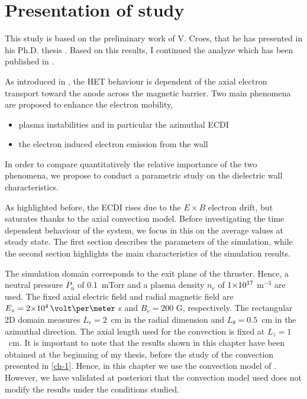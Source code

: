 
\section{Presentation of study}
  \label{sec-params}
  
  \begin{Chabstract}
    
  This study is based on the preliminary work of V. Croes, that he has presented in his Ph.D. thesis \citep{croes2017}.
  Based on this results, I continued the analyze which has been published in  \citet*{tavant2018}.
\end{Chabstract}
  
  \vspace{1ex}
  
  
  As introduced in , the \ac{HET} behaviour is dependent of the axial electron transport toward the anode across the magnetic barrier.
  Two main phenomena are proposed to enhance the electron mobility,
  \begin{itemize}
    \item plasma instabilities and in particular the azimuthal \ac{ECDI}
    \item the electron induced electron emission from the wall
  \end{itemize}
  In order to compare quantitatively the relative importance of the two phenomena, we propose to conduct a parametric study on the dielectric wall characteristics.

  As highlighted before, the \ac{ECDI} rises due to the $E \times B$ electron drift, but saturates thanks to the axial convection model.
  Before investigating the time dependent behaviour of the system, we focus in this  on the average values at steady state.
  The first section describes the parameters of the simulation, 
  while the second section highlights the main characteristics of the simulation results.

  
  The simulation domain corresponds to the exit plane of the thruster.
  Hence, a neutral pressure $P_n$ of 0.1~mTorr and a plasma density $n_e$ of ${{1}{\times}10^{17}}$ m$^{-3}$ are used.
  The fixed axial electric field and radial magnetic field are $E_z=\sn{2}{4}\,\volt\per\meter$ s and $B_r=200$ G, respectively.
  The rectangular \ac{2D} domain measures $L_r=2$~cm in the radial dimension and $L_{\theta}=0.5$~cm in the azimuthal direction.
  The axial length used for the convection is fixed at $L_z=1$~cm.
  It is important to note that the results shown in this chapter have been obtained at the beginning of my thesis, before the study of the convection presented in \cref{ch-1}.
  Hence, in this chapter we use the convection model of \citet{lafleur2016a}.
  However, we have validated at posteriori that the convection model used does not modify the results under the conditions studied.
  
